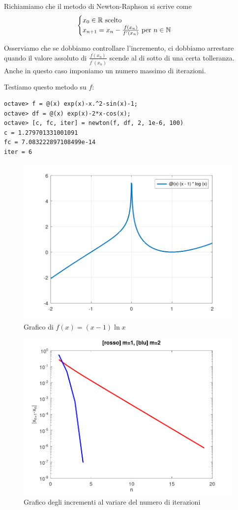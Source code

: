 Richiamiamo che il metodo di \textenglish{Newton-Raphson} si scrive come
\[\begin{cases} x_0 \in \mathbb R \text{ scelto} \\ x_{n+1} = x_n - \frac{f(x_n)}{f^\prime (x_n)} \text{ per } n \in \mathbb N \end{cases}\]

Osserviamo che se dobbiamo controllare l'incremento, ci dobbiamo arrestare quando il valore assoluto di \(\frac{f(x_n)}{f^\prime (x_n)}\) scende al di sotto di una certa tolleranza. Anche in questo caso imponiamo un numero massimo di iterazioni. 



Testiamo questo metodo su \(f\):

\begin{lstlisting}[numbers=none]
octave> f = @(x) exp(x)-x.^2-sin(x)-1;
octave> df = @(x) exp(x)-2*x-cos(x);
octave> [c, fc, iter] = newton(f, df, 2, 1e-6, 100)
c = 1.279701331001091
fc = 7.083222897108499e-14
iter = 6
\end{lstlisting}


\begin{figure}
\centering
\includegraphics[width=.7\textwidth]{../zeri/graph2.png}
\caption{Grafico di \(f(x) = (x-1)\ln x\)}
\end{figure}

\begin{figure}
\centering
\includegraphics[width=.7\textwidth]{../zeri/convergences.png}
\caption{Grafico degli incrementi al variare del numero di iterazioni}
\label{fig:convergences}
\end{figure}

